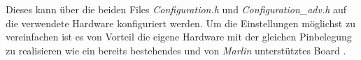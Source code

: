 Dieses kann über die beiden Files \textit{Configuration.h} und \textit{Configuration\_adv.h} auf die verwendete Hardware konfiguriert werden. Um die Einstellungen möglichst zu vereinfachen ist es von Vorteil die eigene Hardware mit der gleichen Pinbelegung zu realisieren wie ein bereits bestehendes und von \textit{Marlin} unterstütztes Board \cite{Marlin_Configuration}. 





